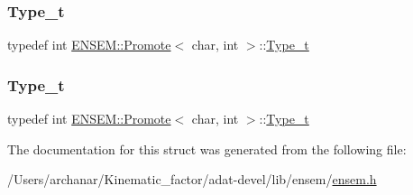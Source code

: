 \subsubsection{\texorpdfstring{Type\_t}{Type\_t}\hspace{0.1cm}{\footnotesize\ttfamily [2/3]}}
{\footnotesize\ttfamily typedef int \mbox{\hyperlink{structENSEM_1_1Promote}{E\+N\+S\+E\+M\+::\+Promote}}$<$ char, int $>$\+::\mbox{\hyperlink{structENSEM_1_1Promote_3_01char_00_01int_01_4_a94b5bc0192c5f4da6285165db6fa7ace}{Type\+\_\+t}}}

\mbox{\label{structENSEM_1_1Promote_3_01char_00_01int_01_4_a94b5bc0192c5f4da6285165db6fa7ace}} 
\subsubsection{\texorpdfstring{Type\_t}{Type\_t}\hspace{0.1cm}{\footnotesize\ttfamily [3/3]}}
{\footnotesize\ttfamily typedef int \mbox{\hyperlink{structENSEM_1_1Promote}{E\+N\+S\+E\+M\+::\+Promote}}$<$ char, int $>$\+::\mbox{\hyperlink{structENSEM_1_1Promote_3_01char_00_01int_01_4_a94b5bc0192c5f4da6285165db6fa7ace}{Type\+\_\+t}}}



The documentation for this struct was generated from the following file\+:\begin{DoxyCompactItemize}
\item 
/\+Users/archanar/\+Kinematic\+\_\+factor/adat-\/devel/lib/ensem/\mbox{\hyperlink{adat-devel_2lib_2ensem_2ensem_8h}{ensem.\+h}}\end{DoxyCompactItemize}
